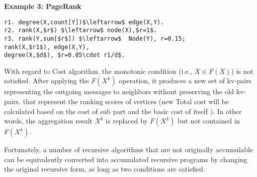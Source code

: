 \textbf{Example 3: PageRank}
\small
\begin{lstlisting}
r1. degree(X,count[Y])$\leftarrow$ edge(X,Y).
r2. rank(X,$r$) $\leftarrow$ node(X),$r=1$.
r3. rank(Y,sum[$r$]) $\leftarrow$  Node(Y), r=0.15;
rank(X,$r1$), edge(X,Y),
degree(X,$d$), $r=0.85\cdot r1/d$.
\end{lstlisting}
\normalsize


With regard to Cost algorithm, the monotonic condition (i.e., $X\in F(X)$) is not satisfied. After applying the $F(X^{k})$ operation, it produces a new set of kv-pairs representing the outgoing messages to neighbors  without preserving the old kv-pairs. {\color{green}that represent the ranking scores of vertices} (new Total cost  will be calculated based on the cost of sub part and the basic cost of itself ). In other words, the aggregation result $X^{k}$ is replaced by $F(X^{k})$ but not contained in $F(X^{k})$.

Fortunately, a number of recursive algorithms that are not originally accumulable can be equivalently converted into accumulated recursive programs by changing the original recursive form, as long as two conditions are satisfied.


